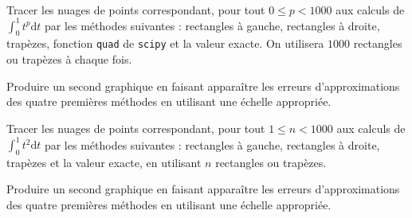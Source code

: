 \exer{[INT-001]}
\setcounter{numques}{0}~\\


 \question{} Tracer les nuages de points correspondant, pour tout $0\leq p < 1000$ aux calculs de $\displaystyle\int_0^1 t^p \mathrm{d}t$ par les méthodes suivantes : rectangles à gauche, rectangles à droite, trapèzes, fonction \texttt{quad} de \texttt{scipy} et la valeur exacte.
  On utilisera $1000$ rectangles ou trapèzes à chaque fois.
  

\question{} Produire un second graphique en faisant apparaître les erreurs d'approximations des quatre premières méthodes en utilisant une échelle appropriée. 

\question{} Tracer les nuages de points correspondant, pour tout $1\leq n < 1000$ aux calculs de $\displaystyle\int_0^1 t^2 \mathrm{d}t$ par les méthodes suivantes : rectangles à gauche, rectangles à droite, trapèzes  et la valeur exacte, en utilisant $n$ rectangles ou trapèzes.
  
\question{} Produire un second graphique en faisant apparaître les erreurs d'approximations des quatre premières méthodes en utilisant une échelle appropriée. 